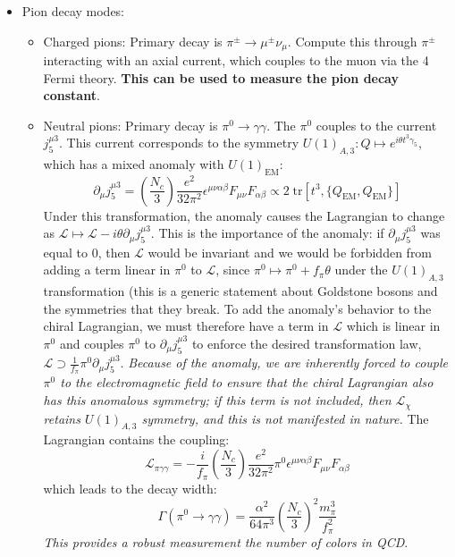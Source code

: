 \documentclass[11pt, oneside]{article}   	%
\theoremstyle{definition}
\numberwithin{equation}{subsection}		%
\begin{document}
\begin{itemize}
	\item Pion decay modes: 
	\begin{itemize}
		\item Charged pions: Primary decay is $\pi^\pm\rightarrow\mu^\pm \nu_\mu$. Compute this through $\pi^\pm$ interacting with an axial current, which couples 
		to the muon via the 4 Fermi theory. \textbf{This can be used to measure the pion decay constant}.
		\item Neutral pions: Primary decay is $\pi^0\rightarrow\gamma\gamma$. The $\pi^0$ couples to the current $j_5^{\mu 3}$. This current corresponds 
		to the symmetry $U(1)_{A, 3} : Q\mapsto e^{i\theta t^3\gamma_5}$, which has a mixed anomaly with $U(1)_\mathrm{EM}$:
		\begin{equation}
			\partial_\mu j_5^{\mu 3} = \left(\frac{N_c}{3}\right) \frac{e^2}{32\pi^2}\epsilon^{\mu\nu\alpha\beta} F_{\mu\nu} F_{\alpha\beta} \propto 2\;\mathrm{tr}[t^3, \{Q_\mathrm{EM}, Q_\mathrm{EM}\}]
		\end{equation}
		Under this transformation, the anomaly causes the Lagrangian to change as $\mathcal L\mapsto \mathcal L - i\theta\partial_\mu j_5^{\mu 3}$. 
		This is the importance of the anomaly: if $\partial_\mu j_5^{\mu 3}$ was equal to 0, then $\mathcal L$ would be invariant and we would be forbidden 
		from adding a term linear in $\pi^0$ to $\mathcal L$, since $\pi^0\mapsto \pi^0 + f_\pi\theta$ under the $U(1)_{A, 3}$ transformation (this is a generic 
		statement about Goldstone bosons and the symmetries that they break. To add the anomaly's behavior to the chiral Lagrangian, we must therefore have 
		a term in $\mathcal L$ which is linear in $\pi^0$ and couples $\pi^0$ to $\partial_\mu j_5^{\mu 3}$ to enforce the desired transformation law, 
		$\mathcal L\supset \frac{1}{f_\pi} \pi^0\partial_\mu j_5^{\mu 3}$. \textit{Because of the anomaly, we are inherently forced to couple $\pi^0$ to the 
		electromagnetic field to ensure that the chiral Lagrangian also has this anomalous symmetry; if this term is not included, then $\mathcal L_\chi$ 
		retains $U(1)_{A, 3}$ symmetry, and this is not manifested in nature.}
		The Lagrangian contains the coupling:
		\begin{equation}
			\mathcal L_{\pi\gamma\gamma} = -\frac{i}{f_\pi}\left(\frac{N_c}{3}\right) \frac{e^2}{32\pi^2}\pi^0\epsilon^{\mu\nu\alpha\beta} F_{\mu\nu} F_{\alpha\beta}
		\end{equation}
		which leads to the decay width:
		\begin{equation}
			\Gamma(\pi^0\rightarrow\gamma\gamma) = \frac{\alpha^2}{64\pi^3}\left(\frac{N_c}{3}\right)^2\frac{m_\pi^3}{f_\pi^2}
		\end{equation}
		\textit{This provides a robust measurement the number of colors in QCD}.
	\end{itemize}
	

\end{itemize}
\end{document}
